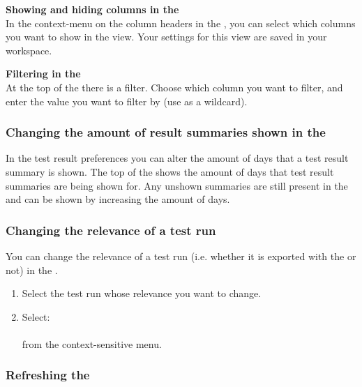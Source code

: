 \textbf{Showing and hiding columns in the \gdtestsummaryview}\\

In the context-menu on the column headers in the \gdtestsummaryview{}, you can select which columns you want to show in the view. Your settings for this view are saved in your workspace. 

\textbf{Filtering in the \gdtestsummaryview}\\

At the top of the \gdtestsummaryview{} there is a filter. Choose which column you want to filter, and enter the value you want to filter by (use \bxshell{*} as a wildcard). 

\subsubsection{Changing the amount of result summaries shown in the \gdtestsummaryview{}}

In the test result preferences  you can alter the amount of days that a test result summary is shown. The top of the \gdtestsummaryview{} shows the amount of days that test result summaries are being shown for. Any unshown summaries are still present in the \gddb{} and can be shown by increasing the amount of days. 

\subsubsection{Changing the relevance of a test run}
\label{TasksChangeRelevance}
You can change the relevance of a test run (i.e. whether it is exported with the \gdproject{} or not) in the \gdtestsummaryview{}.
\begin{enumerate}
\item Select the test run whose relevance you want to change.
\item Select:\\
\\
from the context-sensitive menu.
\end{enumerate}

\subsubsection{Refreshing the \gdtestsummaryview{}}

